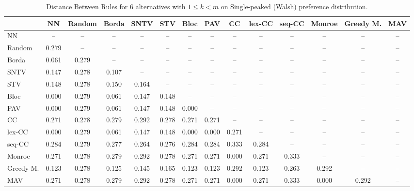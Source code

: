 
\begin{table*}
\centering
\begin{tabular}{lccccccccccccc}
\toprule
 & NN & Random & Borda & SNTV & STV & Bloc & PAV & CC & lex-CC & seq-CC & Monroe & Greedy M. & MAV \\
\midrule
NN & -- & -- & -- & -- & -- & -- & -- & -- & -- & -- & -- & -- & -- \\
Random & 0.279 & -- & -- & -- & -- & -- & -- & -- & -- & -- & -- & -- & -- \\
Borda & 0.061 & 0.279 & -- & -- & -- & -- & -- & -- & -- & -- & -- & -- & -- \\
SNTV & 0.147 & 0.278 & 0.107 & -- & -- & -- & -- & -- & -- & -- & -- & -- & -- \\
STV & 0.148 & 0.278 & 0.150 & 0.164 & -- & -- & -- & -- & -- & -- & -- & -- & -- \\
Bloc & 0.000 & 0.279 & 0.061 & 0.147 & 0.148 & -- & -- & -- & -- & -- & -- & -- & -- \\
PAV & 0.000 & 0.279 & 0.061 & 0.147 & 0.148 & 0.000 & -- & -- & -- & -- & -- & -- & -- \\
CC & 0.271 & 0.278 & 0.279 & 0.292 & 0.278 & 0.271 & 0.271 & -- & -- & -- & -- & -- & -- \\
lex-CC & 0.000 & 0.279 & 0.061 & 0.147 & 0.148 & 0.000 & 0.000 & 0.271 & -- & -- & -- & -- & -- \\
seq-CC & 0.284 & 0.279 & 0.277 & 0.264 & 0.276 & 0.284 & 0.284 & 0.333 & 0.284 & -- & -- & -- & -- \\
Monroe & 0.271 & 0.278 & 0.279 & 0.292 & 0.278 & 0.271 & 0.271 & 0.000 & 0.271 & 0.333 & -- & -- & -- \\
Greedy M. & 0.123 & 0.278 & 0.125 & 0.145 & 0.165 & 0.123 & 0.123 & 0.292 & 0.123 & 0.263 & 0.292 & -- & -- \\
MAV & 0.271 & 0.278 & 0.279 & 0.292 & 0.278 & 0.271 & 0.271 & 0.000 & 0.271 & 0.333 & 0.000 & 0.292 & -- \\
\bottomrule
\end{tabular}

\caption{Distance Between Rules for 6 alternatives with $1 \leq k < m$ on Single-peaked (Walsh) preference distribution.}
\end{table*}
